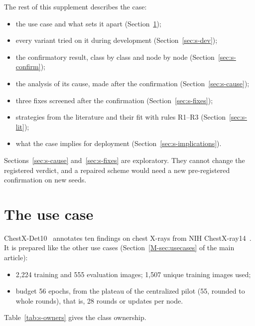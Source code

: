 \documentclass[pdflatex,sn-mathphys-num]{sn-jnl}
\begin{document}
The rest of this supplement describes the case:
\begin{itemize}
\item the use case and what sets it apart (Section~\ref{sec:s-usecase});
\item every variant tried on it during development (Section~\ref{sec:s-dev});
\item the confirmatory result, class by class and node by node (Section~\ref{sec:s-confirm});
\item the analysis of its cause, made after the confirmation (Section~\ref{sec:s-cause});
\item three fixes screened after the confirmation (Section~\ref{sec:s-fixes});
\item strategies from the literature and their fit with rules R1--R3 (Section~\ref{sec:s-lit});
\item what the case implies for deployment (Section~\ref{sec:s-implications}).
\end{itemize}
Sections~\ref{sec:s-cause} and~\ref{sec:s-fixes} are exploratory. They cannot change the registered verdict, and a repaired scheme would need a new pre-registered confirmation on new seeds.

\section{The use case}\label{sec:s-usecase}

ChestX-Det10~\cite{liu2020chestxdet10} annotates ten findings on chest X-rays from NIH ChestX-ray14~\cite{wang2017chestxray8}. It is prepared like the other use cases (Section~\ref{M-sec:usecases} of the main article):
\begin{itemize}
\item 2,224 training and 555 evaluation images; 1,507 unique training images used;
\item budget 56 epochs, from the plateau of the centralized pilot (55, rounded to whole rounds), that is, 28 rounds or updates per node.
\end{itemize}
Table~\ref{tab:s-owners} gives the class ownership.
\end{document}
